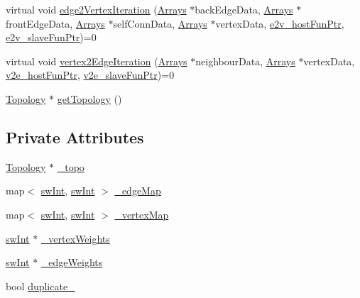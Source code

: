 \begin{DoxyCompactItemize}
\item 
virtual void \mbox{\hyperlink{classUNAT_1_1Iterator_a59fb9d4c251dd0456078decabf332399}{edge2\+Vertex\+Iteration}} (\mbox{\hyperlink{structArrays}{Arrays}} $\ast$back\+Edge\+Data, \mbox{\hyperlink{structArrays}{Arrays}} $\ast$front\+Edge\+Data, \mbox{\hyperlink{structArrays}{Arrays}} $\ast$self\+Conn\+Data, \mbox{\hyperlink{structArrays}{Arrays}} $\ast$vertex\+Data, \mbox{\hyperlink{test_2directSegment_2iterator_8h_ae588e578b6781906a44208130df0ab29}{e2v\+\_\+host\+Fun\+Ptr}}, \mbox{\hyperlink{test_2directSegment_2iterator_8h_a7b58029f74760f3ca5384034c0e89c15}{e2v\+\_\+slave\+Fun\+Ptr}})=0
\item 
virtual void \mbox{\hyperlink{classUNAT_1_1Iterator_a0bb9f9c408c19b3c6bb342d37b333a1c}{vertex2\+Edge\+Iteration}} (\mbox{\hyperlink{structArrays}{Arrays}} $\ast$neighbour\+Data, \mbox{\hyperlink{structArrays}{Arrays}} $\ast$vertex\+Data, \mbox{\hyperlink{test_2directSegment_2iterator_8h_a15a4eedea7b94460153f0a0924c98224}{v2e\+\_\+host\+Fun\+Ptr}}, \mbox{\hyperlink{test_2directSegment_2iterator_8h_acd8809485e3b16adfce1d459f3372671}{v2e\+\_\+slave\+Fun\+Ptr}})=0
\item 
\mbox{\hyperlink{classUNAT_1_1Topology}{Topology}} $\ast$ \mbox{\hyperlink{classUNAT_1_1Iterator_a22ec6ca24e5c28053cbda5a1970fe86c}{get\+Topology}} ()
\end{DoxyCompactItemize}
\subsection*{Private Attributes}
\begin{DoxyCompactItemize}
\item 
\mbox{\hyperlink{classUNAT_1_1Topology}{Topology}} $\ast$ \mbox{\hyperlink{classUNAT_1_1Iterator_a609edbe5270c133e5883453d3d1a5e56}{\+\_\+topo}}
\item 
map$<$ \mbox{\hyperlink{include_2swMacro_8h_a113cf5f6b5377cdf3fac6aa4e443e9aa}{sw\+Int}}, \mbox{\hyperlink{include_2swMacro_8h_a113cf5f6b5377cdf3fac6aa4e443e9aa}{sw\+Int}} $>$ \mbox{\hyperlink{classUNAT_1_1Iterator_ac047c3fcc34d74653bf8c9b84259362a}{\+\_\+edge\+Map}}
\item 
map$<$ \mbox{\hyperlink{include_2swMacro_8h_a113cf5f6b5377cdf3fac6aa4e443e9aa}{sw\+Int}}, \mbox{\hyperlink{include_2swMacro_8h_a113cf5f6b5377cdf3fac6aa4e443e9aa}{sw\+Int}} $>$ \mbox{\hyperlink{classUNAT_1_1Iterator_a8765de7f8e6473c0868bfc25fa40fa7a}{\+\_\+vertex\+Map}}
\item 
\mbox{\hyperlink{include_2swMacro_8h_a113cf5f6b5377cdf3fac6aa4e443e9aa}{sw\+Int}} $\ast$ \mbox{\hyperlink{classUNAT_1_1Iterator_a9da915e0a553c64ec43c299d70398f22}{\+\_\+vertex\+Weights}}
\item 
\mbox{\hyperlink{include_2swMacro_8h_a113cf5f6b5377cdf3fac6aa4e443e9aa}{sw\+Int}} $\ast$ \mbox{\hyperlink{classUNAT_1_1Iterator_a4dc20c3b10cf1acbf4d7ab9ce1d7fec2}{\+\_\+edge\+Weights}}
\item 
bool \mbox{\hyperlink{classUNAT_1_1Iterator_a3edaf3538d36c649321535de2ae0ec0d}{duplicate\+\_\+}}
\end{DoxyCompactItemize}


